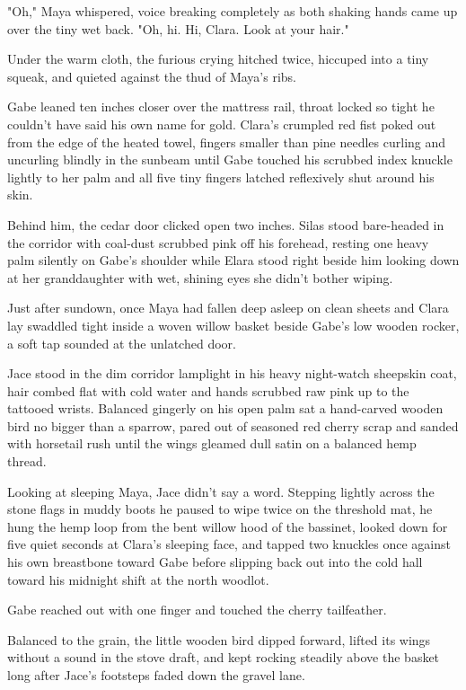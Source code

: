 "Oh," Maya whispered, voice breaking completely as both shaking hands came up over the tiny wet back. "Oh, hi. Hi, Clara. Look at your hair."

Under the warm cloth, the furious crying hitched twice, hiccuped into a tiny squeak, and quieted against the thud of Maya's ribs.

Gabe leaned ten inches closer over the mattress rail, throat locked so tight he couldn't have said his own name for gold. Clara's crumpled red fist poked out from the edge of the heated towel, fingers smaller than pine needles curling and uncurling blindly in the sunbeam until Gabe touched his scrubbed index knuckle lightly to her palm and all five tiny fingers latched reflexively shut around his skin.

Behind him, the cedar door clicked open two inches. Silas stood bare-headed in the corridor with coal-dust scrubbed pink off his forehead, resting one heavy palm silently on Gabe's shoulder while Elara stood right beside him looking down at her granddaughter with wet, shining eyes she didn't bother wiping.

\bigskip

Just after sundown, once Maya had fallen deep asleep on clean sheets and Clara lay swaddled tight inside a woven willow basket beside Gabe's low wooden rocker, a soft tap sounded at the unlatched door.

Jace stood in the dim corridor lamplight in his heavy night-watch sheepskin coat, hair combed flat with cold water and hands scrubbed raw pink up to the tattooed wrists. Balanced gingerly on his open palm sat a hand-carved wooden bird no bigger than a sparrow, pared out of seasoned red cherry scrap and sanded with horsetail rush until the wings gleamed dull satin on a balanced hemp thread.

Looking at sleeping Maya, Jace didn't say a word. Stepping lightly across the stone flags in muddy boots he paused to wipe twice on the threshold mat, he hung the hemp loop from the bent willow hood of the bassinet, looked down for five quiet seconds at Clara's sleeping face, and tapped two knuckles once against his own breastbone toward Gabe before slipping back out into the cold hall toward his midnight shift at the north woodlot.

Gabe reached out with one finger and touched the cherry tailfeather.

Balanced to the grain, the little wooden bird dipped forward, lifted its wings without a sound in the stove draft, and kept rocking steadily above the basket long after Jace's footsteps faded down the gravel lane.
